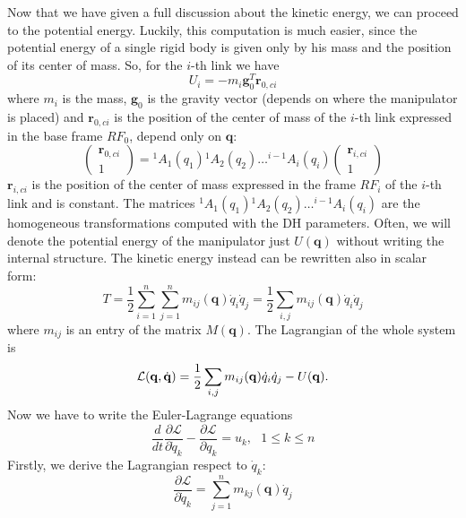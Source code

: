 \documentclass[10pt, a4paper]{report}
\newcommand{\q}{{\mathbf q}}
\begin{document}
Now that we have given a full discussion about the kinetic energy, we can proceed to the potential energy. Luckily, this computation is much easier, since the potential energy of a single rigid body is given only by his mass and the position of its center of mass. So, for the $i$-th link we have\begin{equation}
    U_i=-m_i\mathbf g_0^T\mathbf r_{0,ci}
\end{equation}
where $m_i$ is the mass, $\mathbf g_0$ is the gravity vector (depends on where the manipulator is placed) and $\mathbf r_{0,ci}$ is the position of the center of mass of the $i$-th link expressed in the base frame $RF_0$, depend only on $\q$:\begin{equation}
    \begin{pmatrix}
        \mathbf r_{0,ci}\\ 1
    \end{pmatrix}= {}^1A_1(q_1)
    {}^1A_2(q_2)\dots  
    {}^{i-1}A_i(q_i)\begin{pmatrix}
        \mathbf r_{i,ci}\\ 1
    \end{pmatrix}
\end{equation}
$\mathbf r_{i,ci}$ is the position of the center of mass expressed in the frame $RF_i$ of the $i$-th link and is constant. The matrices ${}^1A_1(q_1)
    {}^1A_2(q_2)\dots  
    {}^{i-1}A_i(q_i)$ are the homogeneous transformations computed with the DH parameters. Often, we will denote the potential energy of the manipulator just $U(\q)$ without writing the internal structure. The kinetic energy instead can be rewritten also in scalar form:\begin{equation}
        T=\frac{1}{2}\sum_{i=1}^n\sum_{j=1}^nm_{ij}(\q)\dot q_i\dot q_j=\frac{1}{2}\sum_{i,j}m_{ij}(\q)\dot q_i\dot q_j
    \end{equation}
    where $m_{ij}$ is an entry of the matrix $M(\q)$. The Lagrangian of the whole system is\begin{equation}
        \mathcal L(\q,\dq)=\frac{1}{2}\sum_{i,j}m_{ij}(\q)\dot q_i\dot q_j-U(\q).
    \end{equation}
    Now we have to write the Euler-Lagrange equations\begin{equation}
    \frac{d}{dt}\frac{\partial \mathcal L}{\partial \dot q_k}-\frac{\partial \mathcal L}{\partial q_k}=u_k, \ \ \ 1\le k\le n
\end{equation}
Firstly, we derive the Lagrangian respect to $\dot q_k$:\begin{equation}
    \frac{\partial \mathcal L}{\partial \dot q_k}=\sum_{j=1}^nm_{kj}(\q)\dot q_j
\end{equation}
\end{document}
